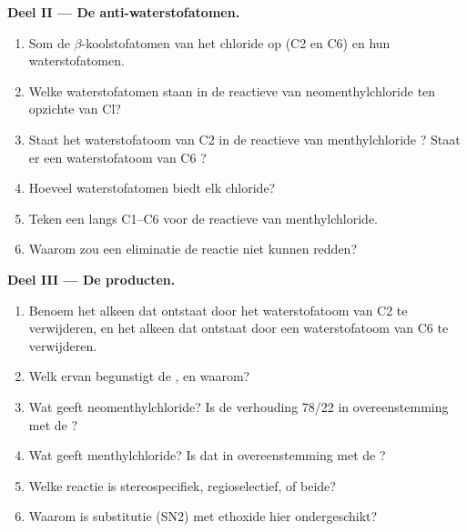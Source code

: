\begin{problem}
\medskip
\noindent\textbf{Deel II --- De anti-waterstofatomen.}
\begin{enumerate}[resume]
  \item Som de $\beta$-koolstofatomen van het chloride op (C2 en C6) en
        hun waterstofatomen.
  \item Welke waterstofatomen staan in de reactieve  van
        neomenthylchloride  ten opzichte van Cl?
  \item Staat het waterstofatoom van C2 in de reactieve  van
        menthylchloride ? Staat er een waterstofatoom van C6
        ?
  \item Hoeveel  waterstofatomen biedt elk chloride?
  \item Teken een  langs C1--C6 voor de reactieve  van
        menthylchloride.
  \item Waarom zou een  eliminatie de reactie niet kunnen
        redden?
\end{enumerate}

\medskip
\noindent\textbf{Deel III --- De producten.}
\begin{enumerate}[resume]
  \item Benoem het alkeen dat ontstaat door het waterstofatoom van C2 te
        verwijderen, en het alkeen dat ontstaat door een waterstofatoom
        van C6 te verwijderen.
  \item Welk ervan begunstigt de , en waarom?
  \item Wat geeft neomenthylchloride? Is de verhouding 78/22 in
        overeenstemming met de ?
  \item Wat geeft menthylchloride? Is dat in overeenstemming met de ?
  \item Welke reactie is stereospecifiek, regioselectief, of beide?
  \item Waarom is substitutie (SN2) met ethoxide hier ondergeschikt?
\end{enumerate}


\end{problem}
